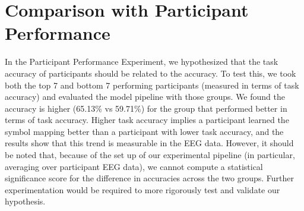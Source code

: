 \section{Comparison with Participant Performance}
In the Participant Performance Experiment, we hypothesized that the task 
accuracy of participants should be related to the \tvt accuracy. To test this, 
we took both the top 7 and bottom 7 performing participants (measured in terms 
of task accuracy) and evaluated the model pipeline with those groups. We found 
the \tvt accuracy is higher (65.13\% vs 59.71\%) for the group that performed 
better in terms of task accuracy. Higher task accuracy implies a participant 
learned the symbol mapping better than a participant with lower task accuracy, 
and the \tvt results show that this trend is measurable in the EEG data.  
However, it should be noted that, because of the set up of our experimental 
pipeline (in particular, averaging over participant EEG data), we cannot 
compute a statistical significance score for the difference in \tvt accuracies 
across the two groups.  Further experimentation would be required to more 
rigorously test and validate our hypothesis.
